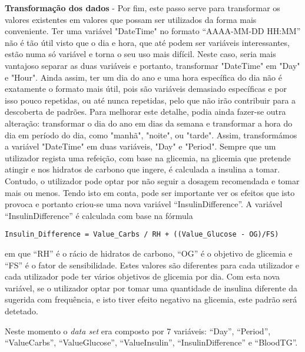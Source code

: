 \textbf{Transformação dos dados} - Por fim, este passo serve para transformar os valores existentes em valores que possam ser utilizados da forma mais conveniente. Ter uma variável "DateTime" no formato ``AAAA-MM-DD HH:MM''  não é tão útil visto que o dia e hora, que até podem ser variáveis interessantes, estão numa só variável e torna o seu uso mais difícil. Neste caso, seria mais vantajoso separar as duas variáveis e portanto, transformar "DateTime" em "Day" e "Hour". Ainda assim, ter um dia do ano e uma hora específica do dia não é exatamente o formato mais útil, pois são variáveis demasiado específicas e por isso pouco repetidas, ou até nunca repetidas, pelo que não irão contribuir para a descoberta de padrões. Para melhorar este detalhe, podia ainda fazer-se outra alteração: transformar o dia do ano em dias da semana e transformar a hora do dia em período do dia, como "manhã", "noite", ou "tarde". Assim, transformámos a variável "DateTime" em duas variáveis, "Day" e "Period".
Sempre que um utilizador regista uma refeição, com base na glicemia, na glicemia que pretende atingir e nos hidratos de carbono que ingere, é calculada a insulina a tomar. Contudo, o utilizador pode optar por não seguir a dosagem recomendada e tomar mais ou menos. Tendo isto em conta, pode ser importante ver os efeitos que isto provoca e portanto criou-se uma nova variável ``Insulin\textunderscore Difference''. 
A variável ``Insulin\textunderscore Difference'' é calculada com base na fórmula\newline\newline

\begin{lstlisting}[caption=Fórmula para calcular insulina a ser tomada, label=form]
Insulin_Difference = Value_Carbs / RH + ((Value_Glucose - OG)/FS)
\end{lstlisting}


em que ``RH'' é o rácio de hidratos de carbono, ``OG''  é o objetivo de glicemia e ``FS''  é o fator de sensibilidade. Estes valores são diferentes para cada utilizador e cada utilizador pode ter vários objetivos de glicemia por dia. 
Com esta nova variável, se o utilizador optar por tomar uma quantidade de insulina diferente da sugerida com frequência, e isto tiver efeito negativo na glicemia, este padrão será detetado. 

Neste momento o \textit{data set} era composto por 7 variáveis: ``Day'', ``Period'', ``Value\textunderscore Carbs'', ``Value\textunderscore Glucose'', ``Value\textunderscore Insulin'', ``Insulin\textunderscore Difference'' e ``Blood\textunderscore TG''.



